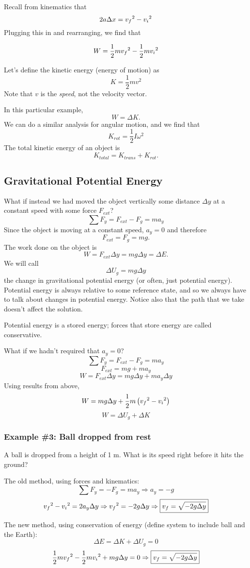 Recall from kinematics that
$$2a\Delta x = v_f\displaystyle^2-v_i\displaystyle^2$$
Plugging this in and rearranging, we find that

$$W=\frac{1}{2}mv_f\displaystyle^2-\frac{1}{2}mv_i\displaystyle^2$$

Let's define the kinetic energy (energy of motion) as
$$\boxed{K=\frac{1}{2}mv^2}$$
Note that $v$ is the \textit{speed}, not the velocity vector. 

In this particular example,
$$W=\Delta{K}.$$
We can do a similar analysis for angular motion, and we find that
$$\boxed{K_{rot}=\frac{1}{2}I\omega^2}$$
The total kinetic energy of an object is
$$K_{total}=K_{trans}+K_{rot}.$$

\subsection{Gravitational Potential Energy}
What if instead we had moved the object vertically some distance $\Delta y$ at a constant speed with some force $F_{ext}$?
$$\sum F_y=F_{ext}-F_g=ma_y$$
Since the object is moving at a constant speed, $a_y=0$ and therefore
$$F_{ext}=F_g=mg.$$
The work done on the object is
$$W=F_{ext}\Delta{y}=mg\Delta{y}=\Delta{E}.$$
We will call
$$\boxed{\Delta{U_g}=mg\Delta{y}}$$
the change in gravitational potential energy (or often, just potential energy). Potential energy is always relative to some reference state, and so we always have to talk about changes in potential energy. Notice also that the path that we take doesn't affect the solution.

Potential energy is a stored energy; forces that store energy are called conservative.

What if we hadn't required that $a_y=0$?
$$\sum F_y=F_{ext}-F_g=ma_y$$
$$F_{ext}=mg+ma_y$$
$$W = F_{ext}\Delta y = mg\Delta y + ma_y\Delta y$$
Using results from above,
$$W = mg\Delta y + \frac{1}{2}m\left(v_f\displaystyle^2-v_i\displaystyle^2\right)$$
$$W = \Delta U_g + \Delta K$$


\subsubsection{Example \#3: Ball dropped from rest}
A ball is dropped from a height of 1 m. What is its speed right before it hits the ground?

The old method, using forces and kinematics:
$$\sum F_y=-F_g=ma_y\Rightarrow a_y=-g$$
$$v_f\displaystyle^2-v_i\displaystyle^2=2a_y\Delta{y}\Rightarrow v_f\displaystyle^2=-2g\Delta{y}\Rightarrow \boxed{v_f=\sqrt{-2g\Delta{y}}}$$

The new method, using conservation of energy (define system to include ball and the Earth):
$$\Delta{E}=\Delta{K}+\Delta{U_g}=0$$
$$\frac{1}{2}mv_f\displaystyle^2-\frac{1}{2}mv_i\displaystyle^2+mg\Delta{y}=0\Rightarrow \boxed{v_f=\sqrt{-2g\Delta{y}}}$$


